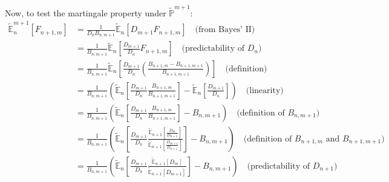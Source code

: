 \documentclass[12pt]{article}
\renewcommand{\P}{\mathbb P}
\newcommand{\E}{\mathbb E}
\begin{document}
Now, to test the martingale property under $\tilde{\P}^{m + 1}$:
\begin{align*}
	\tilde{\E}^{m + 1}_n \left[ F_{n + 1,m} \right] &= \frac{1}{D_nB_{n,m + 1}} \tilde{\E}_n \left[ D_{m + 1}F_{n + 1,m} \right] \quad \text{(from Bayes' II)} \\
	&= \frac{ 1 }{B_{n, m  +1}} \tilde{\E}_n \left[ \frac{D_{m + 1}}{D_n} F_{n + 1,m} \right] \quad \text{(predictability of $D_n$)} \\
	&=  \frac{ 1 }{B_{n, m  +1}} \tilde{\E}_n \left[ \frac{D_{m + 1}}{D_n} \left( \frac{ B_{n + 1,m} - B_{n + 1,m + 1} }{ B_{n + 1,m + 1} } \right) \right] \quad \text{(definition)} \\
	&= \frac{ 1 }{B_{n, m  +1}} \left( \tilde{\E}_n \left[ \frac{D_{m + 1}}{D_n} \frac{B_{n + 1,m}}{B_{n + 1,m + 1}} \right] - \tilde{\E}_n \left[ \frac{D_{m + 1}}{D_n} \right] \right) \quad \text{(linearity)} \\
	&= \frac{ 1 }{B_{n, m  +1}} \left( \tilde{\E}_n \left[ \frac{D_{m + 1}}{D_n} \frac{B_{n + 1,m}}{B_{n + 1,m + 1}} \right] - B_{n,m + 1} \right) \quad \text{(definition of $B_{n,m + 1}$)} \\
	&= \frac{ 1 }{B_{n, m  +1}} \left( \tilde{\E}_n \left[ \frac{D_{m + 1}}{D_n} \frac{ \tilde{\E}_{n + 1} \left[ \frac{D_m}{D_{n + 1}} \right] }{ \tilde{\E}_{n + 1} \left[ \frac{D_{m + 1}}{D_{n + 1}} \right] } \right] - B_{n,m + 1} \right) \quad \text{(definition of $B_{n + 1,m}$ and $B_{n + 1,m + 1}$)} \\
	&= \frac{ 1 }{B_{n, m  +1}} \left( \tilde{\E}_n \left[ \frac{D_{m + 1}}{D_n} \frac{ \tilde{\E}_{n + 1} \left[ D_m \right] }{ \tilde{\E}_{n + 1} \left[ D_{m + 1} \right] } \right] - B_{n,m + 1} \right) \quad \text{(predictability of $D_{n + 1}$)}
\end{align*}
\end{document}
